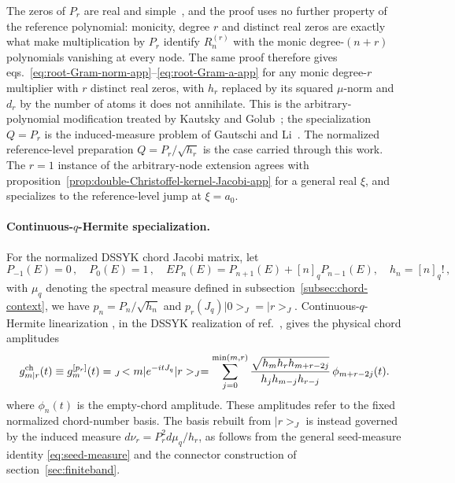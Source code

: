 \documentclass[a4paper,11pt]{article}
\def\ket#1{|#1>}%
\def\bra#1{<#1|}%
\def\dd{d}%
\def\ii{i}%
\def\ee{e}%
\def\Jac{J}%
\theoremstyle{definition}
\theoremstyle{remark}
\newcommand{\ket}[1]{|#1\rangle}
\newcommand{\bra}[1]{\langle #1|}
\newcommand{\dd}{\mathrm d}
\newcommand{\ii}{\mathrm i}
\newcommand{\ee}{\mathrm e}
\newcommand{\Jac}{\mathsf J}
\begin{document}
The zeros of $P_r$ are real and simple~\cite{Chihara1978}, and the proof uses no further property of the reference polynomial: monicity, degree $r$ and distinct real zeros are exactly what make multiplication by $P_r$ identify $R_n^{(r)}$ with the monic degree-$(n+r)$ polynomials vanishing at every node. The same proof therefore gives eqs.~\eqref{eq:root-Gram-norm-app}--\eqref{eq:root-Gram-a-app} for any monic degree-$r$ multiplier with $r$ distinct real zeros, with $h_r$ replaced by its squared $\mu$-norm and $d_r$ by the number of atoms it does not annihilate. This is the arbitrary-polynomial modification treated by Kautsky and Golub~\cite{KautskyGolub1983}; the specialization $Q=P_r$ is the induced-measure problem of Gautschi and Li~\cite{GautschiLi1993}. The normalized reference-level preparation $Q=P_r/\sqrt{h_r}$ is the case carried through this work. The $r=1$ instance of the arbitrary-node extension agrees with proposition~\ref{prop:double-Christoffel-kernel-Jacobi-app} for a general real $\xi$, and specializes to the reference-level jump at $\xi=a_0$.

\paragraph{Continuous-$q$-Hermite specialization.}
For the normalized DSSYK chord Jacobi matrix, let
\begin{equation}
   P_{-1}(E)=0\,,\quad P_0(E)=1\,,\quad
   EP_n(E)=P_{n+1}(E)+[n]_qP_{n-1}(E),\quad
   h_n=[n]_q!\,,
   \label{eq:qhermite-monic-app}
\end{equation}
with $\mu_q$ denoting the spectral measure defined in
subsection~\ref{subsec:chord-context}, we have
$p_n=P_n/\sqrt{h_n}$ and
$p_r(\Jac_q)\ket0_{\Jac}=\ket r_{\Jac}$.  Continuous-$q$-Hermite
linearization \cite{DLMF}, in the DSSYK realization of
ref.~\cite{Berkooz2019DSSYK}, gives the physical chord amplitudes  
\begin{equation}
\begin{aligned}
   g_{m|r}^{\rm ch}(t)
   \equiv g_m^{[p_r]}(t)
   = {}_{\Jac}\!\bra m\ee^{-\ii t\Jac_q}\ket r_{\Jac}
   =\sum_{j=0}^{\min(m,r)}
   \frac{\sqrt{h_mh_rh_{m+r-2j}}}
        {h_jh_{m-j}h_{r-j}}\,
   \phi_{m+r-2j}(t).
\end{aligned}
   \label{eq:qhermite-physical-propagation-app}
\end{equation}
where $\phi_n(t)$ is the empty-chord amplitude.  These amplitudes refer
to the fixed normalized chord-number basis.  The basis rebuilt from $\ket r_{\Jac}$
is instead governed by the induced measure
$\dd\nu_r=P_r^2\dd\mu_q/h_r$, as follows from the general seed-measure identity
\eqref{eq:seed-measure} and the connector construction of section~\ref{sec:finiteband}.
\end{document}
